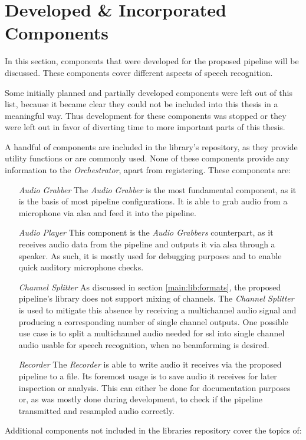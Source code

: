 
\section{Developed \& Incorporated Components}
\label{main:components:start}
In this section, components that were developed for the proposed pipeline will be discussed.
These components cover different aspects of speech recognition.

Some initially planned and partially developed components were left out of this list, because it became clear they could not be included into this thesis in a meaningful way.
Thus development for these components was stopped or they were left out in favor of diverting time to more important parts of this thesis.


A handful of components are included in the library's repository, as they provide utility functions or are commonly used.
None of these components provide any information to the \textit{Orchestrator}, apart from registering.
These components are:
\begin{itemize}[leftmargin=1in]
	\item[\textit{Audio Grabber}] The \textit{Audio Grabber} is the most fundamental component, as it is the basis of most pipeline configurations.
	It is able to grab audio from a microphone via \gls{alsa} and feed it into the pipeline.

	\item[\textit{Audio Player}] This component is the \textit{Audio Grabbers} counterpart, as it receives audio data from the pipeline and outputs it via \gls{alsa} through a speaker.
	As such, it is mostly used for debugging purposes and to enable quick auditory microphone checks.

	\item[\textit{Channel Splitter}] As discussed in section \ref{main:lib:formats}, the proposed pipeline's library does not support mixing of channels.
	The \textit{Channel Splitter} is used to mitigate this absence by receiving a multichannel audio signal and producing a corresponding number of single channel outputs.
	One possible use case is to split a multichannel audio needed for \gls{ssl} into single channel audio usable for speech recognition, when no beamforming is desired.

	\item[\textit{Recorder}] The \textit{Recorder} is able to write audio it receives via the proposed pipeline to a file.
	Its foremost usage is to save audio it receives for later inspection or analysis.
	This can either be done for documentation purposes or, as was mostly done during development, to check if the pipeline transmitted and resampled audio correctly.
\end{itemize}
Additional components not included in the libraries repository cover the topics of:

